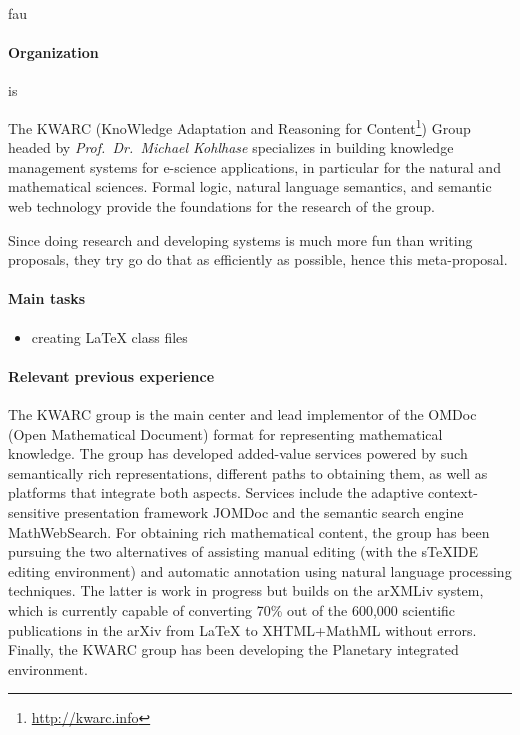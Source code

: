\begin{sitedescription}{fau}

  \paragraph{Organization}
   is 
  
The KWARC (KnoWledge Adaptation and Reasoning for
Content\footnote{\url{http://kwarc.info}}) Group headed by {\emph{Prof.\ Dr.\ Michael
    Kohlhase}} specializes in building knowledge management systems for e-science
applications, in particular for the natural and mathematical sciences.  Formal logic,
natural language semantics, and semantic web technology provide the foundations for the
research of the group.
  
Since doing research and developing systems is much more fun than writing proposals, they
try go do that as efficiently as possible, hence this meta-proposal.

\paragraph{Main tasks}

\begin{itemize}
\item creating {\LaTeX} class files
\end{itemize}

\paragraph{Relevant previous experience}

The KWARC group is the main center and lead implementor of the OMDoc (Open Mathematical
Document) format for representing mathematical knowledge.  The group has developed
added-value services powered by such semantically rich representations, different paths to
obtaining them, as well as platforms that integrate both aspects.  Services include the
adaptive context-sensitive presentation framework JOMDoc and the semantic search engine
MathWebSearch.  For obtaining rich mathematical content, the group has been pursuing the
two alternatives of assisting manual editing (with the sTeXIDE editing environment) and
automatic annotation using natural language processing techniques.  The latter is work in
progress but builds on the arXMLiv system, which is currently capable of converting 70\%
out of the 600,000 scientific publications in the arXiv from {\LaTeX} to XHTML+MathML
without errors.  Finally, the KWARC group has been developing the Planetary integrated
environment.


\end{sitedescription}
